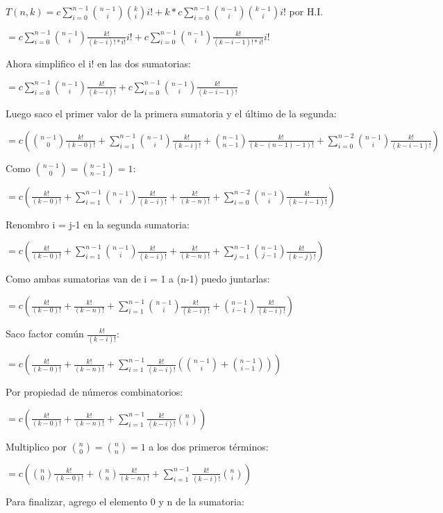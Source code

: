 $T(n,k) = c \sum_{i=0}^{n-1} \binom{n-1}{i} \binom{k}{i} i! + k * c \sum_{i=0}^{n-1} \binom{n-1}{i} \binom{k-1}{i} i!$ por H.I.

$ = c \sum_{i=0}^{n-1} \binom{n-1}{i} \frac{k!}{(k-i)!*i!} i! + c \sum_{i=0}^{n-1} \binom{n-1}{i} \frac{k!}{(k-i-1)!*i!}i! $ 

Ahora simplifico el i! en las dos sumatorias:

$ = c \sum_{i=0}^{n-1} \binom{n-1}{i} \frac{k!}{(k-i)!} + c \sum_{i=0}^{n-1} \binom{n-1}{i} \frac{k!}{(k-i-1)!} $

Luego saco el primer valor de la primera sumatoria y el último de la segunda:

$ = c (\binom{n-1}{0} \frac{k!}{(k-0)!} + \sum_{i=1}^{n-1} \binom{n-1}{i} \frac{k!}{(k-i)!} + \binom{n-1}{n-1} \frac{k!}{(k-(n-1)-1)!} + \sum_{i=0}^{n-2} \binom{n-1}{i} \frac{k!}{(k-i-1)!} )$

Como $\binom{n-1}{0} = \binom{n-1}{n-1} = 1$:

$ = c (\frac{k!}{(k-0)!} + \sum_{i=1}^{n-1} \binom{n-1}{i} \frac{k!}{(k-i)!} + \frac{k!}{(k-n)!} + \sum_{i=0}^{n-2} \binom{n-1}{i} \frac{k!}{(k-i-1)!} )$

Renombro i = j-1 en la segunda sumatoria:

$ = c (\frac{k!}{(k-0)!} + \sum_{i=1}^{n-1} \binom{n-1}{i} \frac{k!}{(k-i)!} + \frac{k!}{(k-n)!} + \sum_{j=1}^{n-1} \binom{n-1}{j-1} \frac{k!}{(k-j)!} )$ 

Como ambas sumatorias van de i = 1 a (n-1) puedo juntarlas:

$ = c (\frac{k!}{(k-0)!} + \frac{k!}{(k-n)!} + \sum_{i=1}^{n-1} \binom{n-1}{i} \frac{k!}{(k-i)!} + \binom{n-1}{i-1} \frac{k!}{(k-i)!} )$ 

Saco factor común $\frac{k!}{(k-i)!}$:

$ = c (\frac{k!}{(k-0)!} + \frac{k!}{(k-n)!} + \sum_{i=1}^{n-1} \frac{k!}{(k-i)!} (\binom{n-1}{i} + \binom{n-1}{i-1} ))$ 

Por propiedad de números combinatorios:

$ = c (\frac{k!}{(k-0)!} + \frac{k!}{(k-n)!} + \sum_{i=1}^{n-1} \frac{k!}{(k-i)!}\binom{n}{i})$ 

Multiplico por $\binom{n}{0} = \binom{n}{n}= 1$ a los dos primeros términos:

$ = c (\binom{n}{0}\frac{k!}{(k-0)!} + \binom{n}{n}\frac{k!}{(k-n)!} + \sum_{i=1}^{n-1} \frac{k!}{(k-i)!}\binom{n}{i})$

Para finalizar, agrego el elemento 0 y n de la sumatoria:

